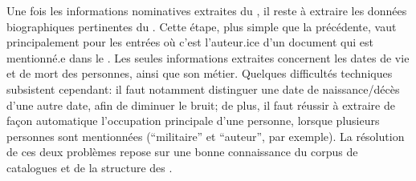 Une fois les informations nominatives extraites du \tname{}, il reste à extraire les données biographiques pertinentes du \ttrait{}. Cette étape, plus simple que la précédente, vaut principalement pour les entrées où c'est l'auteur.ice d'un document qui est mentionné.e dans le \tname{}. Les seules informations extraites concernent les dates de vie et de mort des personnes, ainsi que son métier. Quelques difficultés techniques subsistent cependant: il faut notamment distinguer une date de naissance/décès d'une autre date, afin de diminuer le bruit; de plus, il faut réussir à extraire de façon automatique l'occupation principale d'une personne, lorsque plusieurs personnes sont mentionnées (\enquote{militaire} et \enquote{auteur}, par exemple). La résolution de ces deux problèmes repose sur une bonne connaissance du corpus de catalogues et de la structure des \ttrait{}.



